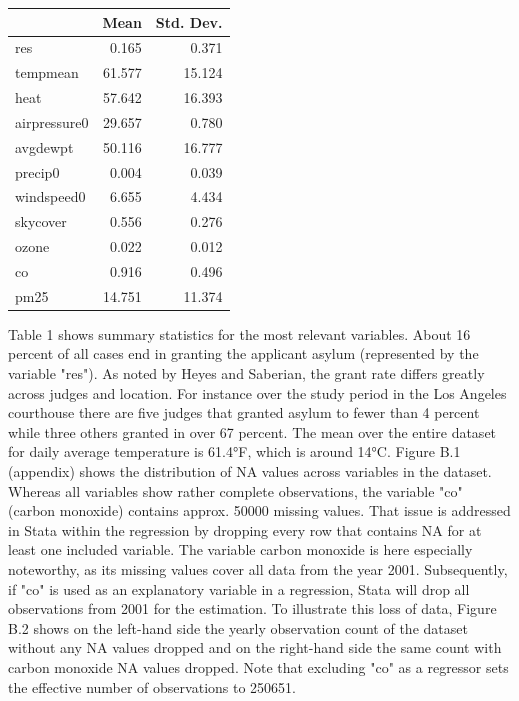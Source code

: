 \documentclass[11pt]{article}
\begin{document}
	\begin{center}
		 \label{tab:title}
		\begin{tabular}{lrr}
			\toprule
			{} &       Mean &  Std. Dev. \\
			\midrule
			res          &   0.165 &      0.371 \\
			tempmean     &  61.577 &     15.124 \\
			heat         &  57.642 &     16.393 \\
			airpressure0 &  29.657 &      0.780 \\
			avgdewpt     &  50.116 &     16.777 \\
			precip0      &   0.004 &      0.039 \\
			windspeed0   &   6.655 &      4.434 \\
			skycover     &   0.556 &      0.276 \\
			ozone        &   0.022 &      0.012 \\
			co           &   0.916 &      0.496 \\
			pm25         &  14.751 &     11.374 \\
			\bottomrule
		\end{tabular}
	\end{center}

	Table 1 shows summary statistics for the most relevant variables. About 16 percent of all cases end in granting the applicant asylum (represented by the variable "res"). As noted by Heyes and Saberian, the grant rate differs greatly across judges and location. For instance over the study period in the Los Angeles courthouse there are five judges that granted asylum to fewer than 4 percent while three others granted in over 67 percent. The mean over the entire dataset for daily average temperature is 61.4°F, which is around 14°C.
	\newline Figure B.1 (appendix) shows the distribution of NA values across variables in the dataset. Whereas all variables show rather complete observations, the variable "co" (carbon monoxide) contains approx. 50000 missing values. That issue is addressed in Stata within the regression by dropping every row that contains NA for at least one included variable. The variable carbon monoxide is here especially noteworthy, as its missing values cover all data from the year 2001. Subsequently, if "co" is used as an explanatory variable in a regression, Stata will drop all observations from 2001 for the estimation. To illustrate this loss of data, Figure B.2 shows on the left-hand side the yearly observation count of the dataset without any NA values dropped and on the right-hand side the same count with carbon monoxide NA values dropped. Note that excluding "co" as a regressor sets the effective number of observations to 250651.
\end{document}

